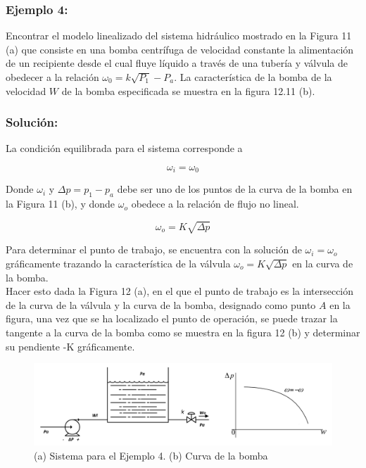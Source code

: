 \documentclass[a4paper,12pt,twoside]{proyectotanquesecci}
\begin{document}
\subsubsection{Ejemplo 4:}

Encontrar el modelo linealizado del sistema hidráulico mostrado en la Figura 11 (a) que consiste en una bomba centrífuga de velocidad constante la alimentación de un recipiente desde el cual fluye líquido a través de una tubería y válvula de obedecer a la relación $\omega _{0}=k\sqrt {P_{1}}-P_{a}$. La característica de la bomba de la velocidad $W$ de la bomba especificada se muestra en la figura 12.11 (b). \\

\subsubsection{Solución:}

La condición equilibrada para el sistema corresponde a 

\begin{equation}
\omega _{i}=\omega _{0}
\end{equation}

Donde $\omega_{i}$ y $\Delta p=p_{1}-p_{a}$ debe ser uno de los puntos de la curva de la bomba en la Figura 11 (b), y donde $\omega_{o}$ obedece a la relación de flujo no lineal.

\begin{equation}
\omega_{o}=K\sqrt{\Delta p}
\end{equation}

Para determinar el punto de trabajo, se encuentra con la solución de $\omega_{i}=\omega_{o}$ gráficamente trazando la característica de la válvula  $\omega_{o}=K\sqrt{\Delta p}$  en la curva de la bomba. \\

Hacer esto dada la Figura 12 (a), en el que el punto de trabajo es la intersección de la curva de la válvula y la curva de la bomba, designado como punto $A$ en la figura, una vez que se ha localizado el punto de operación, se puede trazar la tangente a la curva de la bomba como se muestra en la figura 12 (b) y determinar su pendiente -K gráficamente.

\begin{figure}[h]
\centering
\includegraphics[scale=0.6]{Figura10}
\renewcommand{\figurename}{Fig.}
\caption{(a) Sistema para el Ejemplo 4. (b) Curva de la bomba}
\label{(a) Sistema para el Ejemplo 4. (b) Curva de la bomba}
\end{figure}
\end{document}
